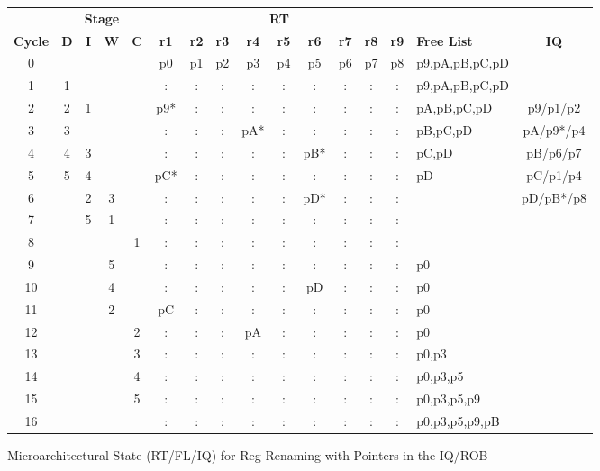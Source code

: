 \documentclass[10pt]{article}
\begin{document}
\begin{figure}[H]
\centering
{\setlength{\tabcolsep}{2pt}
\begin{tabular}{@{\extracolsep{3pt}}cccccccccccccclc@{}}
\hline
& \multicolumn{4}{c}{\textbf{Stage}} & \multicolumn{9}{c}{\textbf{RT}} & & \\
\cline{2-5}
\cline{6-14}
\textbf{Cycle} & \textbf{D} & \textbf{I} & \textbf{W} & \textbf{C} & \textbf{r1} & \textbf{r2} & \textbf{r3} & \textbf{r4} & \textbf{r5} & \textbf{r6} & \textbf{r7} & \textbf{r8} & \textbf{r9} & \textbf{Free List} & \textbf{IQ} \\ \hline
0 &   &   &   &   & p0 & p1 & p2 & p3 & p4 & p5 & p6 & p7 & p8 & p9,pA,pB,pC,pD &          \\ \hline
1 & 1 &   &   &   & :  & :  & :  & :  & :  & :  & :  & :  & :  & p9,pA,pB,pC,pD &          \\ \hline
2 & 2 & 1 &   &   & p9*& :  & :  & :  & :  & :  & :  & :  & :  & pA,pB,pC,pD    & p9/p1/p2 \\ \hline
3 & 3 &   &   &   & :  & :  & :  & pA*& :  & :  & :  & :  & :  & pB,pC,pD       & pA/p9*/p4\\ \hline
4 & 4 & 3 &   &   & :  & :  & :  & :  & :  & pB*& :  & :  & :  & pC,pD          & pB/p6/p7 \\ \hline
5 & 5 & 4 &   &   & pC*& :  & :  & :  & :  & :  & :  & :  & :  & pD             & pC/p1/p4 \\ \hline
6 &   & 2 & 3 &   & :  & :  & :  & :  & :  & pD*& :  & :  & :  &                & pD/pB*/p8\\ \hline
7 &   & 5 & 1 &   & :  & :  & :  & :  & :  & :  & :  & :  & :  &                &          \\ \hline
8 &   &   &   & 1 & :  & :  & :  & :  & :  & :  & :  & :  & :  &                &          \\ \hline
9 &   &   & 5 &   & :  & :  & :  & :  & :  & :  & :  & :  & :  & p0             &          \\ \hline
10&   &   & 4 &   & :  & :  & :  & :  & :  & pD & :  & :  & :  & p0             &          \\ \hline
11&   &   & 2 &   & pC & :  & :  & :  & :  & :  & :  & :  & :  & p0             &          \\ \hline
12&   &   &   & 2 & :  & :  & :  & pA & :  & :  & :  & :  & :  & p0             &          \\ \hline
13&   &   &   & 3 & :  & :  & :  & :  & :  & :  & :  & :  & :  & p0,p3          &          \\ \hline
14&   &   &   & 4 & :  & :  & :  & :  & :  & :  & :  & :  & :  & p0,p3,p5       &          \\ \hline
15&   &   &   & 5 & :  & :  & :  & :  & :  & :  & :  & :  & :  & p0,p3,p5,p9    &          \\ \hline
16&   &   &   &   & :  & :  & :  & :  & :  & :  & :  & :  & :  & p0,p3,p5,p9,pB &          \\ \hline
\end{tabular}
}
\caption{Microarchitectural State (RT/FL/IQ) for Reg Renaming with Pointers in the IQ/ROB}
\end{figure} 
\end{document}
